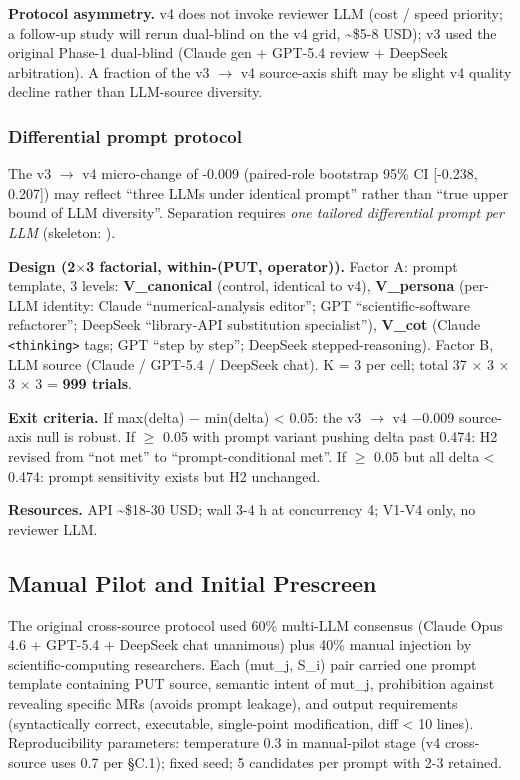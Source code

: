 \documentclass[review,12pt,authoryear]{elsarticle}
\begin{document}
\textbf{Protocol asymmetry.} v4 does not invoke reviewer LLM (cost
/ speed priority; a follow-up study will rerun dual-blind on the v4
grid, \textasciitilde\$5-8 USD); v3 used the original Phase-1 dual-blind
(Claude gen + GPT-5.4 review + DeepSeek arbitration). A fraction of the
v3 $\to$ v4 source-axis shift may be slight v4 quality decline rather than
LLM-source diversity.

\subsubsection{Differential prompt protocol}\label{c.1.1-differential-prompt-protocol-future-work-commitment}

The v3 $\to$ v4 micro-change of -0.009 (paired-role bootstrap 95\% CI
[-0.238, 0.207]) may reflect ``three LLMs under
identical prompt'' rather than ``true upper bound of LLM diversity''.
Separation requires \emph{one tailored differential prompt per LLM}
(skeleton: ).

\textbf{Design (2$\times$3 factorial, within-(PUT, operator)).} Factor A:
prompt template, 3 levels: \textbf{V\_canonical} (control, identical to
v4), \textbf{V\_persona} (per-LLM identity: Claude ``numerical-analysis
editor''; GPT ``scientific-software refactorer''; DeepSeek ``library-API
substitution specialist''), \textbf{V\_cot} (Claude
\texttt{\textless{}thinking\textgreater{}} tags; GPT ``step by step'';
DeepSeek stepped-reasoning). Factor B, LLM source (Claude / GPT-5.4 /
DeepSeek chat). K = 3 per cell; total 37 $\times$ 3 $\times$ 3 $\times$ 3 = \textbf{999
trials}.

\textbf{Exit criteria.} If max(delta) − min(delta) \textless{} 0.05: the
v3 $\to$ v4 −0.009 source-axis null is robust. If $\geq$ 0.05 with prompt variant
pushing delta past 0.474: H2 revised from ``not met'' to
``prompt-conditional met''. If $\geq$ 0.05 but all delta \textless{} 0.474:
prompt sensitivity exists but H2 unchanged.

\textbf{Resources.} API \textasciitilde\$18-30 USD; wall 3-4 h at
concurrency 4; V1-V4 only, no reviewer LLM.

\subsection{Manual Pilot and Initial Prescreen}\label{c.2-manual-pilot-lineage-llm-client-configuration-and-l0-prescreen}

The original cross-source protocol used 60\% multi-LLM consensus (Claude Opus
4.6 + GPT-5.4 + DeepSeek chat unanimous) plus 40\% manual injection by
scientific-computing researchers. Each (mut\_j, S\_i) pair carried one
prompt template containing PUT source, semantic intent of mut\_j,
prohibition against revealing specific MRs (avoids prompt leakage), and
output requirements (syntactically correct, executable, single-point
modification, diff \textless{} 10 lines). Reproducibility parameters:
temperature 0.3 in manual-pilot stage (v4 cross-source uses 0.7 per
§C.1); fixed seed; 5 candidates per prompt with 2-3 retained.
\end{document}

